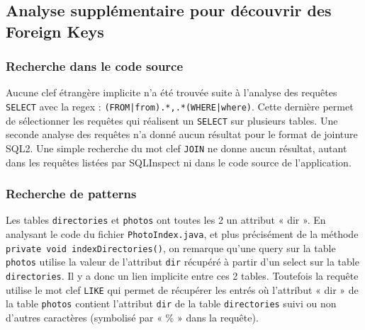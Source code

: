 \subsection{Analyse supplémentaire pour découvrir des Foreign Keys}
\subsubsection{Recherche dans le code source}
Aucune clef étrangère implicite n'a été trouvée suite à l'analyse des requêtes \texttt{SELECT} avec la regex : \texttt{(FROM|from).*,.*(WHERE|where)}. Cette dernière permet de sélectionner les requêtes qui réalisent un \texttt{SELECT} sur plusieurs tables.
Une seconde analyse des requêtes n'a donné aucun résultat pour le format de jointure SQL2. Une simple recherche du mot clef \texttt{JOIN} ne donne aucun résultat, autant dans les requêtes listées par SQLInspect ni dans le code source de l'application.

\subsubsection{Recherche de patterns}
Les tables \texttt{directories} et \texttt{photos} ont toutes les 2 un attribut « dir ». En analysant le code du fichier \texttt{PhotoIndex.java}, et plus précisément de la méthode\\\texttt{private void indexDirectories()}, on remarque qu'une query sur la table \texttt{photos} utilise la valeur de l'attribut \texttt{dir} récupéré à partir d'un select sur la table \texttt{directories}. Il y a donc un lien implicite entre ces 2 tables. Toutefois la requête utilise le mot clef \texttt{LIKE} qui permet de récupérer les entrés où l'attribut « dir » de la table \texttt{photos} contient l'attribut \texttt{dir} de la table \texttt{directories} suivi ou non d'autres caractères (symbolisé par « \% » dans la requête).

\newpage

